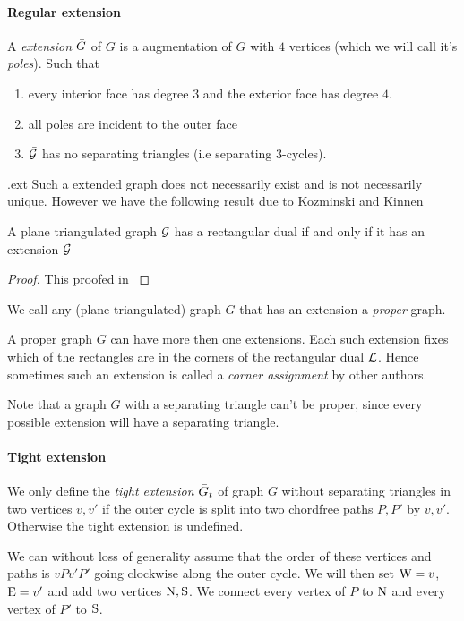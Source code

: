 \paragraph{Regular extension}
A \emph{extension} $\bar{G}$ of $G$ is a augmentation of $G$ with $4$ vertices (which we will call it's \emph{poles}). Such that
\begin{enumerate}
\item every interior face has degree $3$ and the exterior face has degree $4$.
\item all poles are incident to the outer face
\item $\bar{\mathcal{G}}$ has no separating triangles (i.e separating $3$-cycles).
\end{enumerate}.ext
Such a extended graph does not necessarily exist and is not necessarily unique.
However we have the following result due to Kozminski and Kinnen

\begin{thrm}
A plane triangulated graph $\mathcal{G}$ has a rectangular dual if and only if it has an extension $\bar{\mathcal{G}}$
\end{thrm}

\begin{proof}
  This proofed in \cite{Kozminski1984} 
\end{proof}

We call any (plane triangulated) graph $G$ that has an extension a \emph{proper} graph.

A proper graph $G$ can have more then one extensions. Each such extension fixes which of the rectangles are in the corners of the rectangular dual $\mathcal{L}$. Hence sometimes such an extension is called a \emph{corner assignment} by other authors.

Note that a graph $G$ with a separating triangle can't be proper, since every possible extension will have a separating triangle.

\paragraph{Tight extension}
We only define the \emph{tight extension} $\bar{G}_t$ of graph $G$ without separating triangles in two vertices $v, v'$ if the outer cycle is split into two chordfree paths $P, P'$ by $v,v'$. Otherwise the tight extension is undefined.

We can without loss of generality assume that the order of these vertices and paths is $v P v' P'$ going clockwise along the outer cycle. We will then set $\mathrm{W} = v$, $\mathrm{E} =v'$ and add two vertices $\mathrm{N}, \mathrm{S}$. We connect every vertex of $P$ to $\mathrm{N}$ and every vertex of $P'$ to $\mathrm{S}$.

